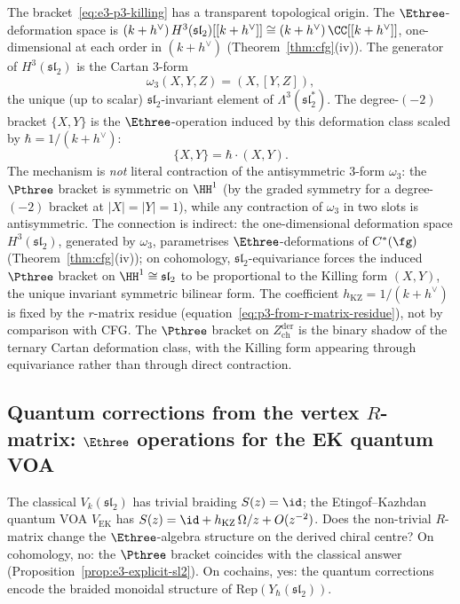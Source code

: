 \begin{remark}
\label{rem:cartan-3-form}
The bracket~\eqref{eq:e3-p3-killing} has a transparent
topological origin. The $\Ethree$-deformation space is
$(k+h^\vee)\,H^3(\mathfrak{sl}_2)[[k+h^\vee]] \cong (k+h^\vee)\,\CC[[k+h^\vee]]$,
one-dimensional at each order in $(k+h^\vee)$
(Theorem~\ref{thm:cfg}(iv)). The generator of
$H^3(\mathfrak{sl}_2)$ is the Cartan $3$-form
\begin{equation}\label{eq:cartan-3form}
 \omega_3(X, Y, Z)
 = (X, [Y, Z]),
\end{equation}
the unique (up to scalar) $\mathfrak{sl}_2$-invariant element
of $\Lambda^3(\mathfrak{sl}_2^*)$. The degree-$(-2)$ bracket
$\{X, Y\}$ is the $\Ethree$-operation induced by this
deformation class scaled by
$\hbar = 1/(k + h^\vee)$:
\[
 \{X, Y\}
 = \hbar \cdot (X, Y).
\]
The mechanism is \emph{not} literal contraction of the
antisymmetric $3$-form $\omega_3$: the $\Pthree$ bracket
is symmetric on $\HH^1$ (by the graded
symmetry for a degree-$(-2)$ bracket at $|X| = |Y| = 1$),
while any contraction of $\omega_3$ in two slots is
antisymmetric. The connection is indirect:
the one-dimensional deformation space
$H^3(\mathfrak{sl}_2)$, generated by $\omega_3$,
parametrises $\Ethree$-deformations of $C^*(\fg)$
(Theorem~\ref{thm:cfg}(iv));
on cohomology, $\mathfrak{sl}_2$-equivariance forces
the induced $\Pthree$ bracket on
$\HH^1 \cong \mathfrak{sl}_2$ to be proportional to
the Killing form $(X, Y)$, the unique invariant
symmetric bilinear form. The coefficient
$h_{\mathrm{KZ}} = 1/(k + h^\vee)$ is fixed by the
$r$-matrix residue
(equation~\eqref{eq:p3-from-r-matrix-residue}), not by
comparison with CFG.
The $\Pthree$ bracket on $Z^{\mathrm{der}}_{\mathrm{ch}}$
is the binary shadow of the ternary Cartan deformation class,
with the Killing form appearing through equivariance rather
than through direct contraction.
\end{remark}

\subsection{Quantum corrections from the vertex $R$-matrix:
$\Ethree$ operations for the EK quantum VOA}
\label{subsec:e3-ek-quantum}

The classical $V_k(\mathfrak{sl}_2)$ has trivial braiding
$S(z) = \id$; the Etingof--Kazhdan quantum VOA
$V_{\mathrm{EK}}$ has
$S(z) = \id + h_{\mathrm{KZ}}\,\Omega/z + O(z^{-2})$. Does
the non-trivial $R$-matrix change the $\Ethree$-algebra
structure on the derived chiral centre? On cohomology, no:
the $\Pthree$ bracket coincides with the classical answer
(Proposition~\ref{prop:e3-explicit-sl2}). On cochains, yes:
the quantum corrections encode the braided monoidal structure
of $\mathrm{Rep}(Y_\hbar(\mathfrak{sl}_2))$.

